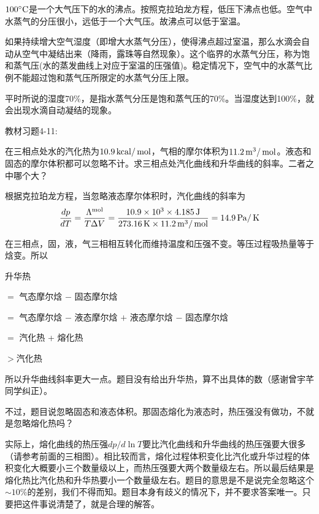 \documentclass[CJK]{beamer}
\begin{document}
\begin{frame}
  \bch
  $100^\circ \mathrm{C}$是一个大气压下的水的沸点。按照克拉珀龙方程，低压下沸点也低。空气中水蒸气的分压很小，远低于一个大气压。故沸点可以低于室温。

  \skipline

  如果持续增大空气湿度（即增大水蒸气分压），使得沸点超过室温，那么水滴会自动从空气中凝结出来（降雨，露珠等自然现象）。这个临界的水蒸气分压，称为饱和蒸气压(水的蒸发曲线上对应于室温的压强值)。稳定情况下，空气中的水蒸气比例不能超过饱和蒸气压所限定的水蒸气分压上限。

  \skipline
  
  平时所说的湿度70\%，是指水蒸气分压是饱和蒸气压的70\%。当湿度达到100\%，就会出现水滴自动凝结的现象。
  \ech
\end{frame}


\begin{frame}
  \chtitle{\proid (\stwo)}
  \bch
  教材习题4-11:

  在三相点处水的汽化热为$10.9\,\mathrm{kcal}/\,\mathrm{mol}$，气相的摩尔体积为$11.2\,\mathrm{m}^3/\,\mathrm{mol}$。液态和固态的摩尔体积都可以忽略不计。求三相点处汽化曲线和升华曲线的斜率。二者之中哪个大？
  \ech
\end{frame}


\begin{frame}
  \bch
  根据克拉珀龙方程，当忽略液态摩尔体积时，汽化曲线的斜率为
  $$\frac{dp}{dT} = \frac{\Lambda^{\rm mol}}{T\Delta V} = \frac{10.9\times 10^3 \times 4.185 \,\mathrm{J}}{273.16\,\mathrm{K}\times 11.2\,\mathrm{m}^3/\,\mathrm{mol}} = 14.9 \,\mathrm{Pa}/\,\mathrm{K}$$

  在三相点，固，液，气三相相互转化而维持温度和压强不变。等压过程吸热量等于焓变。所以

  {\small
  升华热

  $=$ 气态摩尔焓 $-$ 固态摩尔焓

  $=$ 气态摩尔焓 $-$ 液态摩尔焓 $+$ 液态摩尔焓 $-$ 固态摩尔焓

  $=$ 汽化热 + 熔化热

  $>$汽化热
  }
  
  所以升华曲线斜率更大一点。题目没有给出升华热，算不出具体的数（感谢曾宇芊同学纠正）。
  
  \ech
\end{frame}

\begin{frame}
  \bch

  不过，题目说忽略固态和液态体积。那固态熔化为液态时，热压强没有做功，不就是忽略熔化热吗？

  \skiplines
  
  实际上，熔化曲线的热压强$dp/d\ln T$要比汽化曲线和升华曲线的热压强要大很多（请参考前面的三相图）。相比较而言，熔化过程体积变化比汽化或升华过程的体积变化大概要小三个数量级以上，而热压强要大两个数量级左右。所以最后结果是熔化热比汽化热和升华热要小一个数量级左右。题目的意思是不是说完全忽略这个$\sim 10\%$的差别，我们不得而知。题目本身有歧义的情况下，并不要求答案唯一。只要把这件事说清楚了，就是合理的解答。

  
  \ech
\end{frame}
\end{document}
